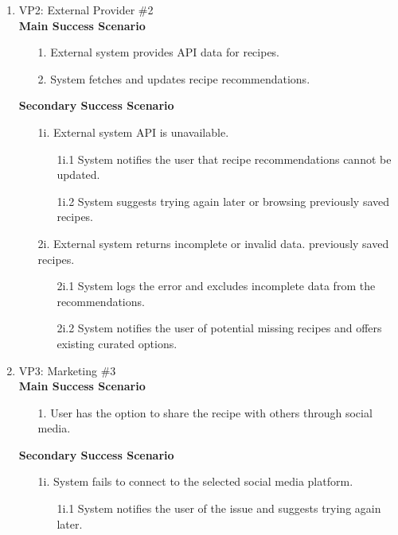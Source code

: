 \documentclass[]{article}
\begin{document}
\begin{enumerate}[{\bf BE1.}]
\begin{enumerate}[{\bf VP1.}]
			\item VP2: External Provider \#2 \\
				\textbf{Main Success Scenario} 
			\begin{enumerate}
				\item[1.] External system provides API data for recipes.
				\item[2.] System fetches and updates recipe recommendations.
			\end{enumerate}
			 \textbf{Secondary Success Scenario}
			  \begin{enumerate}
				\item[1i.] External system API is unavailable.
					\begin{enumerate}
						 \item[1i.1] System notifies the user that recipe recommendations cannot be updated.
						 \item [1i.2] System suggests trying again later or browsing previously saved recipes.
					\end{enumerate}
					\item[2i.] External system returns incomplete or invalid data. previously saved recipes.
					\begin{enumerate}
						 \item[2i.1] System logs the error and excludes incomplete data from the recommendations.
						 \item[2i.2] System notifies the user of potential missing recipes and offers existing curated options.
					\end{enumerate}
			\end{enumerate}
			
			\item VP3: Marketing \#3 \\ 
				\textbf{Main Success Scenario} 
			\begin{enumerate}
				\item[1.] User has the option to share the recipe with others through social media.
			\end{enumerate}
				\textbf{Secondary Success Scenario}
				\begin{enumerate}
				\item[1i.] System fails to connect to the selected social media platform.
					\begin{enumerate}
						 \item[1i.1] System notifies the user of the issue and suggests trying again later.
					\end{enumerate}
				\end{enumerate}
				

\end{enumerate}
\end{enumerate}
\end{document}
